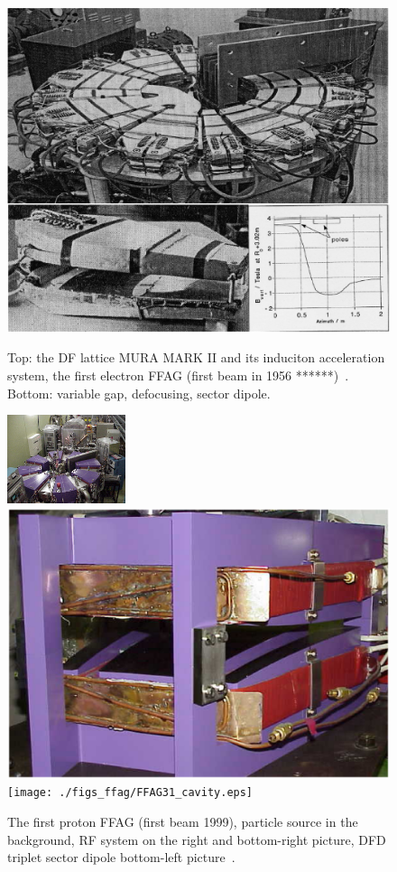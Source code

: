 \begin{figure}[ht]
\sidebyside
{
  \begin{minipage}{.47\linewidth}
    \includegraphics[width=0.99\linewidth]{./figs_ffag/MARKII.eps}
    \caption{
  Top: the DF lattice MURA MARK II and its induciton acceleration system, the 
 first electron FFAG (first beam in 1956 ******)~\cite{BibFFAG-1}.
Bottom: variable gap, defocusing, sector dipole. 
    } 
    \label{figFFAG_MARKII}
   \end{minipage}
}{
  \begin{minipage}{.45\linewidth}
    \includegraphics[width=0.99\linewidth,height=2.6cm]{./figs_ffag/PoPFFAG.eps}\\
    \includegraphics[width=0.52\linewidth]{./figs_ffag/popMagnet.eps}
    \texttt{[image: ./figs\_ffag/FFAG31\_cavity.eps]}
    \caption{
    The first proton FFAG (first beam 1999), particle source 
 in the background, RF system on the right and bottom-right picture, 
DFD triplet sector dipole bottom-left picture~\cite{BibFFAG-2}. 
    }
    \label{figFFAG_POP}
   \end{minipage}
}
\end{figure}

